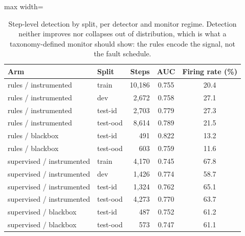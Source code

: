 \begin{table}[!ht]
\centering\scriptsize
\setlength{\tabcolsep}{4pt}
\caption{Step-level detection by split, per detector and monitor regime. Detection neither improves nor collapses out of distribution, which is what a taxonomy-defined monitor should show: the rules encode the signal, not the fault schedule.}
\label{tab:appendix_split_det}
\begin{adjustbox}{max width=\textwidth}
\begin{tabular}{@{}llrcc@{}}
\toprule
Arm & Split & Steps & AUC & Firing rate (\%) \\
\midrule
rules / instrumented & train & 10,186 & 0.755 & 20.4 \\
rules / instrumented & dev & 2,672 & 0.758 & 27.1 \\
rules / instrumented & test-id & 2,703 & 0.779 & 27.3 \\
rules / instrumented & test-ood & 8,614 & 0.789 & 21.5 \\
rules / blackbox & test-id & 491 & 0.822 & 13.2 \\
rules / blackbox & test-ood & 603 & 0.759 & 11.6 \\
supervised / instrumented & train & 4,170 & 0.745 & 67.8 \\
supervised / instrumented & dev & 1,426 & 0.774 & 58.7 \\
supervised / instrumented & test-id & 1,324 & 0.762 & 65.1 \\
supervised / instrumented & test-ood & 4,273 & 0.770 & 63.7 \\
supervised / blackbox & test-id & 487 & 0.752 & 61.2 \\
supervised / blackbox & test-ood & 573 & 0.747 & 61.1 \\
\bottomrule
\end{tabular}
\end{adjustbox}
\end{table}
